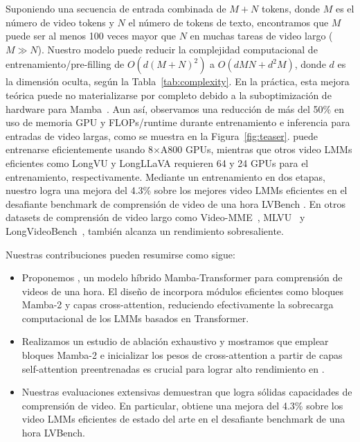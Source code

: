 Suponiendo una secuencia de entrada combinada de $M+N$ tokens, donde $M$ es el número de video tokens y $N$ el número de tokens de texto, encontramos que $M$ puede ser al menos 100 veces mayor que $N$ en muchas tareas de video largo ($M \gg N$). Nuestro modelo puede reducir la complejidad computacional de entrenamiento/pre-filling de $O(d(M+N)^2)$ a $O(dMN+d^2M)$, donde $d$ es la dimensión oculta, según la Tabla~\ref{tab:complexity}. En la práctica, esta mejora teórica puede no materializarse por completo debido a la suboptimización de hardware para Mamba~\citep{gu2023mamba}. Aun así, observamos una reducción de más del 50\% en uso de memoria GPU y FLOPs/runtime durante entrenamiento e inferencia para entradas de video largas, como se muestra en la Figura~\ref{fig:teaser}. \model puede entrenarse eficientemente usando 8$\times$A800 GPUs, mientras que otros video LMMs eficientes como LongVU \cite{shen2024longvu} y LongLLaVA \cite{wang2024longllava} requieren 64 y 24 GPUs para el entrenamiento, respectivamente. Mediante un entrenamiento en dos etapas, nuestro \model logra una mejora del 4.3\% sobre los mejores video LMMs eficientes en el desafiante benchmark de comprensión de video de una hora LVBench \cite{wang2024lvbench}. En otros datasets de comprensión de video largo como Video-MME~\citep{fu2024video}, MLVU~\citep{zhou2024mlvu} y LongVideoBench~\citep{wu2025longvideobench}, \model también alcanza un rendimiento sobresaliente.

\noindent Nuestras contribuciones pueden resumirse como sigue:
\begin{itemize}
    \item [1.] Proponemos \model, un modelo híbrido Mamba-Transformer para comprensión de videos de una hora. El diseño de \model incorpora módulos eficientes como bloques Mamba-2 y capas cross-attention, reduciendo efectivamente la sobrecarga computacional de los LMMs basados en Transformer.
    \item [2.] Realizamos un estudio de ablación exhaustivo y mostramos que emplear bloques Mamba-2 e inicializar los pesos de cross-attention a partir de capas self-attention preentrenadas es crucial para lograr alto rendimiento en \model.
    \item [3.] Nuestras evaluaciones extensivas demuestran que \model logra sólidas capacidades de comprensión de video. En particular, \model obtiene una mejora del 4.3\% sobre los video LMMs eficientes de estado del arte en el desafiante benchmark de una hora LVBench.
\end{itemize}
